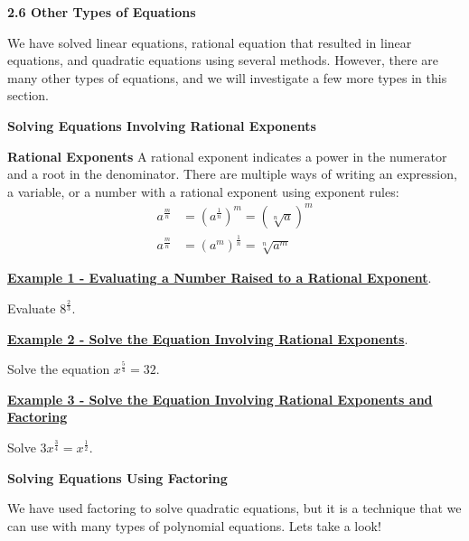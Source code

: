 \documentclass[12pt]{book}
\newcommand{\D}{\displaystyle}
\begin{document}
{\Large \textbf{2.6 Other Types of Equations}}

We have solved linear equations, rational equation that resulted in linear equations, and quadratic equations using several methods. However, there are many other types of equations, and we will investigate a few more types in this section.

\vspace{3mm}

{\large \textbf{Solving Equations Involving Rational Exponents}}
\vspace{3mm}
\begin{boxR}
    \textbf{Rational Exponents}
    \vspace{1mm}
    \hline
    \vspace{2mm}
   A rational exponent indicates a power in the numerator and a root in the denominator. There are multiple ways of writing an expression, a variable, or a number with a rational exponent using exponent rules:
   \begin{align*}
       a^{\frac{m}{n}} &= \left(a^\frac{1}{n}\right)^m =  \left(\sqrt[n]{a}\right)^m \\
       a^{\frac{m}{n}} &= \left(a^m\right)^\frac{1}{n} =\sqrt[n]{a^m}
   \end{align*}
\end{boxR}

\underline{\textbf{Example 1 - Evaluating a Number Raised to a Rational Exponent}}.
\vspace{1mm}

Evaluate $8^\frac{2}{3}$.

\vspace{25mm}

\underline{\textbf{Example 2 - Solve the Equation Involving Rational Exponents}}.
\vspace{1mm}


Solve the equation $\D x^{\frac{5}{4}}=32$.
\vspace{25mm}


\underline{\textbf{Example 3 - Solve the Equation Involving Rational Exponents and Factoring}}
\vspace{1mm}

Solve $3x^{\frac{3}{4}} = x^\frac{1}{2}$.

\newpage
\textbf{\large Solving Equations Using Factoring}
\vspace{3mm}

We have used factoring to solve quadratic equations, but it is a technique that we can use with many types of polynomial equations. Lets take a look!
\\
\end{document}
